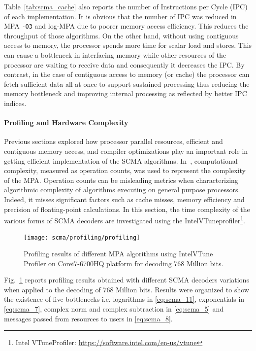 Table~\ref{tab:scma_cache} also reports the number of Instructions per Cycle
(IPC) of each implementation. It is obvious that the number of IPC was reduced
in MPA \verb|-O3| and log-MPA due to poorer memory access efficiency. This
reduces the throughput of those algorithms. On the other hand, without using
contiguous access to memory, the processor spends more time for scalar load and
stores. This can cause a bottleneck in interfacing memory while other resources
of the processor are waiting to receive data and consequently it decreases the
IPC. By contrast, in the case of contiguous access to memory (or cache) the
processor can fetch sufficient data all at once to support sustained processing
thus reducing the memory bottleneck and improving internal processing as
reflected by better IPC indices.

\paragraph{Profiling and Hardware Complexity}
\label{sec:scma_performance_profiling}

Previous sections explored how processor parallel resources, efficient and
contiguous memory access, and compiler optimizations play an important role in
getting efficient implementation of the SCMA algorithms. In~\cite{Zhang2014a,
Liu2016,Jia2018,Du2016a}, computational complexity, measured as operation
counts, was used to represent the complexity of the MPA. Operation counts can be
misleading metrics when characterizing algorithmic complexity of algorithms
executing on general purpose processors. Indeed, it misses significant factors
such as cache misses, memory efficiency and precision of floating-point
calculations. In this section, the time complexity of the various forms of SCMA
decoders are investigated using the Intel\R VTune\TM profiler\footnote{Intel\R
VTune\TM Profiler: \url{https://software.intel.com/en-us/vtune}}.

\begin{figure}
  \centering
  \texttt{[image: scma/profiling/profiling]}
  \caption{Profiling results of different MPA algorithms using Intel\R VTune\TM
    Profiler on Core\TM i7-6700HQ platform for decoding 768 Million bits.}
  \label{plot:scma_profiling}
\end{figure}

Fig.~\ref{plot:scma_profiling} reports profiling results obtained with different
SCMA decoders variations when applied to the decoding of 768 Million bits.
Results were organized to show the existence of five bottlenecks i.e. logarithms
in \eqref{eq:scma_11}, exponentials in \eqref{eq:scma_7}, complex norm and
complex subtraction in \eqref{eq:scma_5} and messages passed from resources to
users in \eqref{eq:scma_8}.

